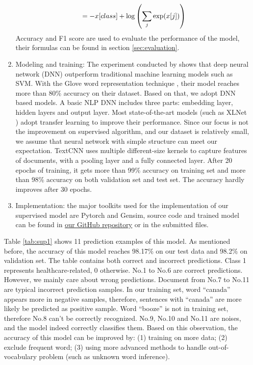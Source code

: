 \begin{enumerate}
$$    \\                     = -x[class] + \log\left(\sum_j \exp(x[j])\right)$$
    Accuracy and F1 score are used to evaluate the performance of the model, their formulas can be found in section \ref{sec:evaluation}.
    \item Modeling and training: The experiment conducted by \cite{serban2019real} shows that deep neural network (DNN) outperform traditional machine learning models such as SVM. With the Glove word representation technique \cite{pennington2014glove}, their model reaches more than 80\% accuracy on their dataset. Based on that, we adopt DNN based models. A basic NLP DNN includes three parts: embedding layer, hidden layers and output layer. Most state-of-the-art models (such as XLNet \cite{yang2019xlnet}) adopt transfer learning to improve their performance. Since our focus is not the improvement on supervised algorithm, and our dataset is relatively small, we assume that neural network with simple structure can meet our expectation. TextCNN \cite{kim2014convolutional} uses multiple different-size kernels to capture features of documents, with a pooling layer and a fully connected layer. After 20 epochs of training, it gets more than 99\% accuracy on training set and more than 98\% accuracy on both validation set and test set. The accuracy hardly improves after 30 epochs. 
    \item Implementation: the major toolkits used for the implementation of our supervised model are Pytorch and Gensim, source code and trained model can be found in \href{https://github.com/NonBee98/FYP}{our GitHub repository} or in the submitted files.
\end{enumerate}
Table \ref{tab:sup1} shows 11 prediction examples of this model. As mentioned before, the accuracy of this model reaches 98.17\% on our test data and 98.2\% on validation set. The table contains both correct and incorrect predictions. Class 1 represents healthcare-related, 0 otherwise. No.1 to No.6 are correct predictions. However, we mainly care about wrong predictions. Document from No.7 to No.11 are typical incorrect prediction samples. In our training set, word ``canada'' appears more in negative samples, therefore, sentences with ``canada'' are more likely be predicted as positive sample. Word ``booze'' is not in training set, therefore No.8 can't be correctly recognized. No.9, No.10 and No.11 are noises, and the model indeed correctly classifies them. Based on this observation, the accuracy of this model can be improved by: (1) training on more data; (2) exclude frequent word; (3) using more advanced methods to handle out-of-vocabulary problem (such as unknown word inference). 
